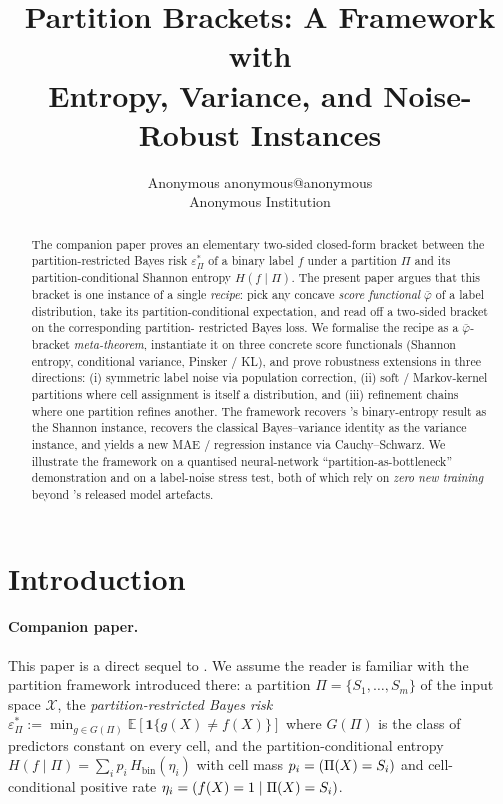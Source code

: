 \documentclass[10pt]{article}
\title{Partition Brackets: A Framework with\\
       Entropy, Variance, and Noise-Robust Instances}
\author{\name Anonymous \email anonymous@anonymous \\
        \addr Anonymous Institution}
\theoremstyle{definition}
\theoremstyle{remark}
\newcommand{\Hbin}{H_{\mathrm{bin}}}
\newcommand{\eps}{\varepsilon}
\newcommand{\epsP}{\eps^{\!*}_{\Pi}}
\let\Pr\relax
\DeclareMathOperator{\Pr}{\mathbb{P}}
\newcommand{\E}{\mathbb{E}}
\newcommand{\bphi}{\bar{\varphi}}        %
\begin{document}
\maketitle

\begin{abstract}
The companion paper \citep{paperA} proves an elementary two-sided
closed-form bracket between the partition-restricted Bayes risk
$\epsP$ of a binary label $f$ under a partition $\Pi$ and its
partition-conditional Shannon entropy $H(f\mid\Pi)$. The present
paper argues that this bracket is one instance of a single
\emph{recipe}: pick any concave \emph{score functional} $\bphi$ of
a label distribution, take its partition-conditional expectation,
and read off a two-sided bracket on the corresponding partition-
restricted Bayes loss. We formalise the recipe as a $\bphi$-bracket
\emph{meta-theorem}, instantiate it on three concrete score
functionals (Shannon entropy, conditional variance, Pinsker /
KL), and prove robustness extensions in three directions:
(i) symmetric label noise via population correction, (ii) soft /
Markov-kernel partitions where cell assignment is itself a
distribution, and (iii) refinement chains where one partition
refines another. The framework recovers 's
binary-entropy result as the Shannon instance, recovers the
classical Bayes--variance identity as the variance instance, and
yields a new MAE / regression instance via Cauchy--Schwarz. We
illustrate the framework on a quantised neural-network
``partition-as-bottleneck'' demonstration and on a label-noise
stress test, both of which rely on \emph{zero new training}
beyond 's released model artefacts.
\end{abstract}

\section{Introduction}\label{sec:intro}

\paragraph{Companion paper.} This paper is a direct sequel to
\citet{paperA}. We assume the reader is familiar with the
partition framework introduced there: a partition
$\Pi=\{S_1,\dots,S_m\}$ of the input space $\mathcal{X}$, the
\emph{partition-restricted Bayes risk}
$\epsP := \min_{g\in G(\Pi)} \E[\mathbf{1}\{g(X)\ne f(X)\}]$
where $G(\Pi)$ is the class of predictors constant on every
cell, and the partition-conditional entropy
$H(f\mid\Pi)=\sum_i p_i\,\Hbin(\eta_i)$ with cell mass
$p_i=\Pr(\Pi(X)=S_i)$ and cell-conditional positive rate
$\eta_i=\Pr(f(X)=1\mid \Pi(X)=S_i)$.
\end{document}
